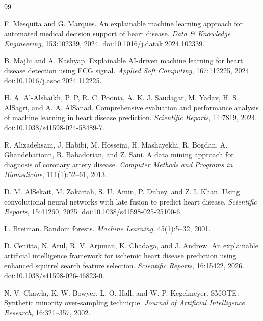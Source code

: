 \documentclass[10pt]{article}
\begin{document}
{\small\setlength{\itemsep}{0pt}
\begin{thebibliography}{99}

F. Mesquita and G. Marques.
\newblock An explainable machine learning approach for automated medical decision support of heart disease.
\newblock \emph{Data \& Knowledge Engineering}, 153:102339, 2024. doi:10.1016/j.datak.2024.102339.

B. Majhi and A. Kashyap.
\newblock Explainable AI-driven machine learning for heart disease detection using ECG signal.
\newblock \emph{Applied Soft Computing}, 167:112225, 2024. doi:10.1016/j.asoc.2024.112225.

H. A. Al-Alshaikh, P. P, R. C. Poonia, A. K. J. Saudagar, M. Yadav, H. S. AlSagri, and A. A. AlSanad.
\newblock Comprehensive evaluation and performance analysis of machine learning in heart disease prediction.
\newblock \emph{Scientific Reports}, 14:7819, 2024. doi:10.1038/s41598-024-58489-7.

R. Alizadehsani, J. Habibi, M. Hosseini, H. Mashayekhi, R. Bogdan, A. Ghandeharioun, B. Bahadorian, and Z. Sani.
\newblock A data mining approach for diagnosis of coronary artery disease.
\newblock \emph{Computer Methods and Programs in Biomedicine}, 111(1):52--61, 2013.

D. M. AlSekait, M. Zakariah, S. U. Amin, P. Dubey, and Z. I. Khan.
\newblock Using convolutional neural networks with late fusion to predict heart disease.
\newblock \emph{Scientific Reports}, 15:41260, 2025. doi:10.1038/s41598-025-25100-6.

L. Breiman.
\newblock Random forests.
\newblock \emph{Machine Learning}, 45(1):5--32, 2001.

D. Cenitta, N. Arul, R. V. Arjunan, K. Chadaga, and J. Andrew.
\newblock An explainable artificial intelligence framework for ischemic heart disease prediction using enhanced squirrel search feature selection.
\newblock \emph{Scientific Reports}, 16:15422, 2026. doi:10.1038/s41598-026-46823-0.

N. V. Chawla, K. W. Bowyer, L. O. Hall, and W. P. Kegelmeyer.
\newblock SMOTE: Synthetic minority over-sampling technique.
\newblock \emph{Journal of Artificial Intelligence Research}, 16:321--357, 2002.


\end{thebibliography}}
\end{document}
